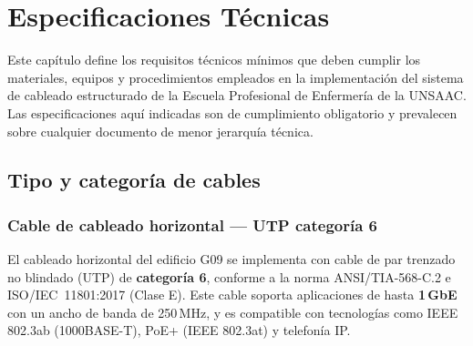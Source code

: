 \chapter{Especificaciones Técnicas}
\label{chap:especificaciones}

Este capítulo define los requisitos técnicos mínimos que deben cumplir los
materiales, equipos y procedimientos empleados en la implementación del sistema
de cableado estructurado de la Escuela Profesional de Enfermería de la UNSAAC.
Las especificaciones aquí indicadas son de cumplimiento obligatorio y prevalecen
sobre cualquier documento de menor jerarquía técnica.

\section{Tipo y categoría de cables}
\label{sec:cables}

\subsection{Cable de cableado horizontal — UTP categoría 6}

El cableado horizontal del edificio G09 se implementa con cable de par trenzado
no blindado (UTP) de \textbf{categoría 6}, conforme a la norma
\mbox{ANSI/TIA-568-C.2} e \mbox{ISO/IEC 11801:2017} (Clase E). Este cable
soporta aplicaciones de hasta \textbf{1\,GbE} con un ancho de banda de
250\,MHz, y es compatible con tecnologías como IEEE 802.3ab (1000BASE-T),
PoE+ (IEEE 802.3at) y telefonía IP.

